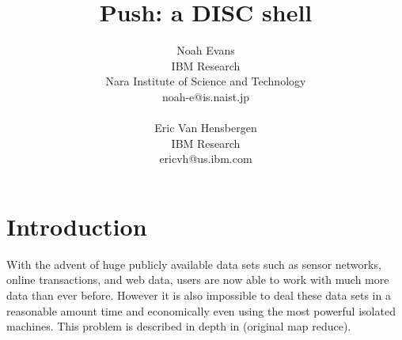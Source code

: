 \documentclass[11pt, letterpaper]{article}
\title{Push: a DISC shell}
\author{Noah Evans\\
IBM Research\\
Nara Institute of Science and Technology\\
noah-e@is.naist.jp\\\\
Eric Van Hensbergen\\
IBM Research\\
ericvh@us.ibm.com\\
}
\date{}
\begin{document}
\maketitle
\pagebreak
%
%
\section{Introduction}

With the advent of huge publicly available data sets such as sensor networks, online transactions, and web data, users are now able to work with much more data than ever before. However it is also impossible to deal these data sets in a reasonable amount time and economically even using the most powerful isolated machines. This problem is described in depth in (original map reduce).  
\end{document}
